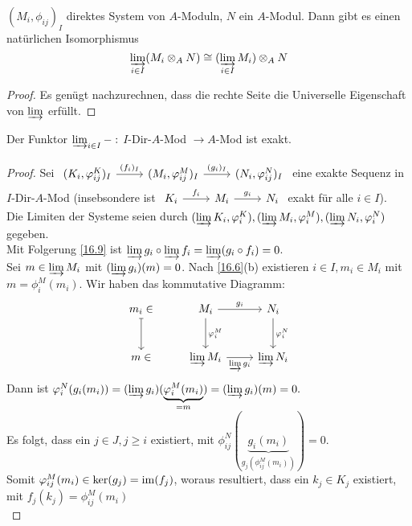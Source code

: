 \begin{bem} \label{16.11}
	$(M_i, \phi_{ij})_I $ direktes System von $A$-Moduln, $N$ ein $A$-Modul. Dann gibt es einen natürlichen Isomorphismus $$\varinjlim_{i\in I}(M_i \otimes_A N) \cong (\varinjlim_{i\in I} M_i) \otimes_A N $$
\end{bem}
\begin{proof}
	Es genügt nachzurechnen, dass die rechte Seite die Universelle Eigenschaft von $\varinjlim$ erfüllt.
\end{proof}
\begin{sa} \label{16.12}
	Der Funktor $\varinjlim_{i\in I} - :$ $I$-Dir-$A$-Mod $\to A$-Mod  ist exakt. 
\end{sa}
\begin{proof}
	Sei $\begin{tikzcd}
	(K_i, \phi_{ij}^K)_I \arrow{r}{(f_i)_I} & (M_i, \phi_{ij}^M)_I  \arrow{r}{(g_i)_I} & (N_i, \phi_{ij}^N)_I \end{tikzcd}$ eine exakte Sequenz in $I$-Dir-$A$-Mod (insebsondere ist $\begin{tikzcd} K_i \arrow{r}{f_i} & M_i \arrow{r}{g_i} & N_i \end{tikzcd}$ exakt für alle $i \in I$). \\
	 Die Limiten der Systeme seien durch $(\varinjlim K_i, \phi_i^K),(\varinjlim M_i, \phi_i^M), (\varinjlim N_i, \phi_i^N) $ gegeben. \\
	Mit Folgerung \ref{16.9} ist $\varinjlim g_i \circ \varinjlim f_i = \varinjlim (g_i \circ f_i) = 0$. \\
	Sei $m \in \varinjlim M_i $ mit $ (\varinjlim g_i)(m) = 0$. Nach \ref{16.6}(b) existieren $ i \in I, m_i \in M_i $ mit $m=\phi_i^M(m_i) $. Wir haben das kommutative Diagramm: \\
	$$\begin{tikzcd}[row sep = large]
	m_i \in \arrow[mapsto]{d} & M_i \arrow{r}{g_i} \arrow{d}{\phi_i^M} & N_i \arrow{d}{\phi_i^N} \\
	m \in & \varinjlim M_i \arrow[swap]{r}{\varinjlim g_i} & \varinjlim N_i
	\end{tikzcd}$$
	Dann ist $ \phi_i^N(g_i(m_i)) = (\varinjlim g_i)(\underbrace{\phi_i^M(m_i)}_{=m}) = (\varinjlim g_i)(m) = 0.$  \\
	Es folgt, dass ein $j \in J, j \geq i $ existiert, mit $\phi_{ij}^N(\underbrace{g_i(m_i)}_{g_j(\phi_{ij}^M(m_i))})= 0.$ \\
 	Somit $ \phi_{ij}^M(m_i) \in \ker(g_j) = \im(f_j) $, woraus resultiert, dass ein $k_j \in K_j $ existiert, mit $ f_j(k_j) = \phi_{ij}^M(m_i)$\\

\end{proof}

